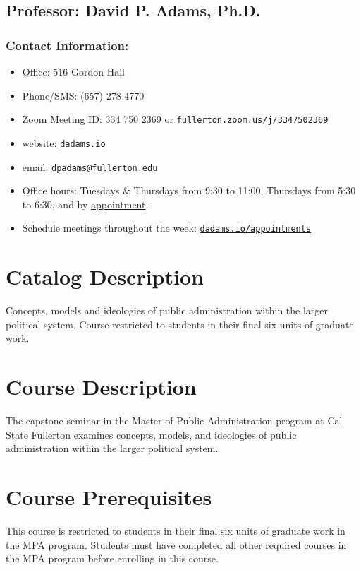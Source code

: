 \documentclass[12pt, letterpaper]{article}
\begin{document}
    \subsection*{Professor: David P. Adams, Ph.D.}

    \subsubsection*{Contact Information:}
    
    \begin{itemize}
        \item Office: 516 Gordon Hall
        \item Phone/SMS: (657) 278-4770
        \item Zoom Meeting ID: 334 750 2369 or \href{https://fullerton.zoom.us/j/3347502369}{\texttt{fullerton.zoom.us/j/3347502369}} 
        \item website: \href{https://dadams.io}{\texttt{dadams.io}}
        \item email: \href{dpadams@fullerton.edu}{\texttt{dpadams@fullerton.edu}}
        \item Office hours: Tuesdays \& Thursdays from 9:30 to 11:00, Thursdays from 5:30 to 6:30, and by \href{https://dadams.io/appointments}{appointment}.
        \item Schedule meetings throughout the week: \href{https://dadams.io/appointments}{\texttt{dadams.io/appointments}}
    \end{itemize}
    
    \section{Catalog Description}
    Concepts, models and ideologies of public administration within the larger political system. Course restricted to students in their final six units of graduate work.
    
    \section{Course Description}
    The capstone seminar in the Master of Public Administration program at Cal State Fullerton examines concepts, models, and ideologies of public administration within the larger political system.

    \section{Course Prerequisites}
    This course is restricted to students in their final six units of graduate work in the MPA program. Students must have completed all other required courses in the MPA program before enrolling in this course.
    
\end{document}
